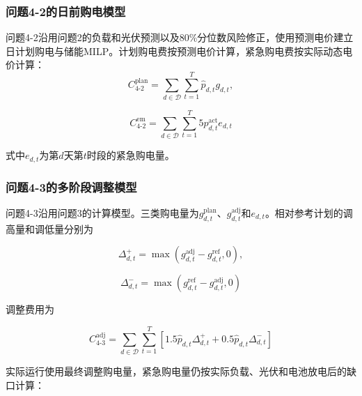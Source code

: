 \documentclass[UTF8]{ctexart}
\begin{document}
    \subsubsection{问题4-2的日前购电模型}
    
    问题4-2沿用问题2的负载和光伏预测以及80\%分位数风险修正，使用预测电价建立日计划购电与储能MILP。计划购电费按预测电价计算，紧急购电费按实际动态电价计算：
    \begin{equation}
        C_{4\text{-}2}^{\mathrm{plan}}
        =\sum_{d\in\mathcal D}\sum_{t=1}^{T}
        \widehat p_{d,t}g_{d,t},
    \end{equation}
    
    \begin{equation}
        C_{4\text{-}2}^{\mathrm{em}}
        =\sum_{d\in\mathcal D}\sum_{t=1}^{T}
        5p_{d,t}^{\mathrm{act}}e_{d,t}
    \end{equation}
    
    式中$e_{d,t}$为第$d$天第$t$时段的紧急购电量。\par
    
    \subsubsection{问题4-3的多阶段调整模型}
    
    问题4-3沿用问题3的计算模型。三类购电量为$g_{d,t}^{\mathrm{plan}}$、$g_{d,t}^{\mathrm{adj}}$和$e_{d,t}$。相对参考计划的调高量和调低量分别为
    
    \begin{equation}
        \Delta_{d,t}^{+}
        =\max\left(
        g_{d,t}^{\mathrm{adj}}-g_{d,t}^{\mathrm{ref}},0
        \right),
    \end{equation}
    
    \begin{equation}
        \Delta_{d,t}^{-}
        =\max\left(
        g_{d,t}^{\mathrm{ref}}-g_{d,t}^{\mathrm{adj}},0
        \right)
    \end{equation}
    
    调整费用为
    
    \begin{equation}
        C_{4\text{-}3}^{\mathrm{adj}}
        =\sum_{d\in\mathcal D}\sum_{t=1}^{T}
        \left[
        1.5\widehat p_{d,t}\Delta_{d,t}^{+}
        +0.5\widehat p_{d,t}\Delta_{d,t}^{-}
        \right]
    \end{equation}
    
    实际运行使用最终调整购电量，紧急购电量仍按实际负载、光伏和电池放电后的缺口计算：
    
\end{document}
